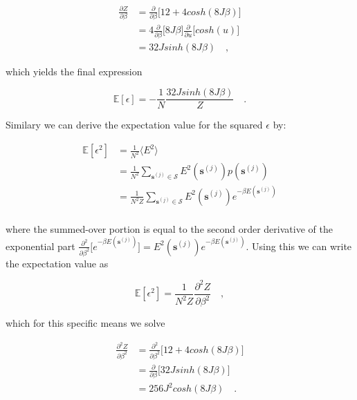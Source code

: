 \documentclass[../main_proj4_correct_template.tex]{subfiles}
\begin{document}
\begin{equation*}
\begin{split}
    \frac{\partial Z}{\partial\beta} &= \frac{\partial }{\partial\beta}\bigg[ 12 + 4cosh(8J\beta)\bigg] \\
    &= 4\frac{\partial }{\partial\beta}\bigg[ 8J\beta\bigg] \frac{\partial }{\partial u}\bigg[cosh(u)\bigg] \\
    &=32 J sinh(8J\beta) \quad,
    \end{split}
\end{equation*}

\noindent which yields the final expression 

\begin{equation*}
    \mathbb{E}[\epsilon] = - \frac{1}{N}\frac{32Jsinh(8J\beta)}{Z} \quad.
\end{equation*}

Similary we can derive the expectation value for the squared $\epsilon$ by:

\begin{equation*}
\begin{split}
    \mathbb{E}[\epsilon^{2}] & = \frac{1}{N^{2}} \langle E^{2}\rangle \\
    &= \frac{1}{N^{2}} \sum\limits_{\mathbf{s}^{(j)} \in \mathcal{S}} E^{2}(\mathbf{s}^{(j)}) p(\mathbf{s}^{(j)}) \\
    &= \frac{1}{N^{2}Z} \sum\limits_{\mathbf{s}^{(j)} \in \mathcal{S}} E^{2}(\mathbf{s}^{(j)}) e^{-\beta E(\mathbf{s}^{(j)})} \\
\end{split}    
\end{equation*}

\noindent where the summed-over portion is equal to the second order derivative of the exponential part $\frac{\partial^{2}}{\partial \beta^{2}}\big[e^{-\beta E(\mathbf{s}^{(j)})}\big] = E^{2}(\mathbf{s}^{(j)}) e^{-\beta E(\mathbf{s}^{(j)})}$. Using this we can write the expectation value as

\begin{equation*}
    \mathbb{E}[\epsilon^{2}] = \frac{1}{N^{2}Z} \frac{\partial^{2}Z}{\partial \beta^{2}} \quad,
\end{equation*}

\noindent which for this specific means we solve

\begin{equation*}
\begin{split}
    \frac{\partial^{2}Z}{\partial \beta^{2}} &= \frac{\partial^{2}}{\partial \beta^{2}} \bigg[ 12 + 4cosh(8J\beta)\bigg] \\
    &= \frac{\partial}{\partial\beta}\bigg[32 J sinh(8J\beta)\bigg] \\
    &=256 J^{2} cosh(8J\beta) \quad.
\end{split}
\end{equation*}
\end{document}
